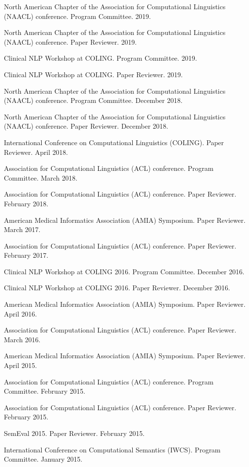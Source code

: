 \documentclass[letterpaper]{article}
\renewenvironment{itemize}{
  \begin{list}{}{
    \setlength{\leftmargin}{1.5em}
  }
}{
  \end{list}
}
\begin{document}
\begin{itemize}
\item North American Chapter of the Association for Computational Linguistics (NAACL) conference. Program Committee. 2019.
\item North American Chapter of the Association for Computational Linguistics (NAACL) conference. Paper Reviewer. 2019.
\item Clinical NLP Workshop at COLING. Program Committee. 2019.
\item Clinical NLP Workshop at COLING. Paper Reviewer. 2019.
\item North American Chapter of the Association for Computational Linguistics (NAACL) conference. Program Committee. December 2018.
\item North American Chapter of the Association for Computational Linguistics (NAACL) conference. Paper Reviewer. December 2018.
\item International Conference on Computational Linguistics (COLING). Paper Reviewer. April 2018.
\item Association for Computational Linguistics (ACL) conference. Program Committee. March 2018.
\item Association for Computational Linguistics (ACL) conference. Paper Reviewer. February 2018.
\item American Medical Informatics Association (AMIA) Symposium. Paper Reviewer. March 2017.
\item Association for Computational Linguistics (ACL) conference. Paper Reviewer. February 2017.
\item Clinical NLP Workshop at COLING 2016. Program Committee. December 2016.
\item Clinical NLP Workshop at COLING 2016. Paper Reviewer. December 2016.
\item American Medical Informatics Association (AMIA) Symposium. Paper Reviewer. April 2016.
\item Association for Computational Linguistics (ACL) conference. Paper Reviewer. March 2016.
\item American Medical Informatics Association (AMIA) Symposium. Paper Reviewer. April 2015.
\item Association for Computational Linguistics (ACL) conference. Program Committee. February 2015.
\item Association for Computational Linguistics (ACL) conference. Paper Reviewer. February 2015.
\item SemEval 2015. Paper Reviewer. February 2015.
\item International Conference on Computational Semantics (IWCS). Program Committee. January 2015.

\end{itemize}
\end{document}

